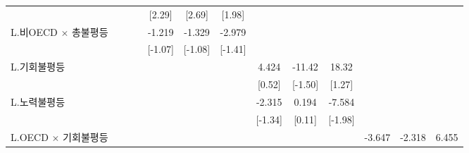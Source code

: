 \begin{table}[htbp]
{\begin{tabular}{l*{12}{c}}
                    &                     &                     &                     &      [2.29]         &      [2.69]         &      [1.98]         &                     &                     &                     &                     &                     &                     \\
\addlinespace
L.비OECD $\times$ 총불평등&                     &                     &                     &      -1.219         &      -1.329         &      -2.979         &                     &                     &                     &                     &                     &                     \\
                    &                     &                     &                     &     [-1.07]         &     [-1.08]         &     [-1.41]         &                     &                     &                     &                     &                     &                     \\
\addlinespace
L.기회불평등        &                     &                     &                     &                     &                     &                     &       4.424         &      -11.42         &       18.32         &                     &                     &                     \\
                    &                     &                     &                     &                     &                     &                     &      [0.52]         &     [-1.50]         &      [1.27]         &                     &                     &                     \\
\addlinespace
L.노력불평등        &                     &                     &                     &                     &                     &                     &      -2.315         &       0.194         &      -7.584\sym{**} &                     &                     &                     \\
                    &                     &                     &                     &                     &                     &                     &     [-1.34]         &      [0.11]         &     [-1.98]         &                     &                     &                     \\
\addlinespace
L.OECD $\times$ 기회불평등&                     &                     &                     &                     &                     &                     &                     &                     &                     &      -3.647         &      -2.318         &       6.455         \\

\end{tabular}}
\end{table}
